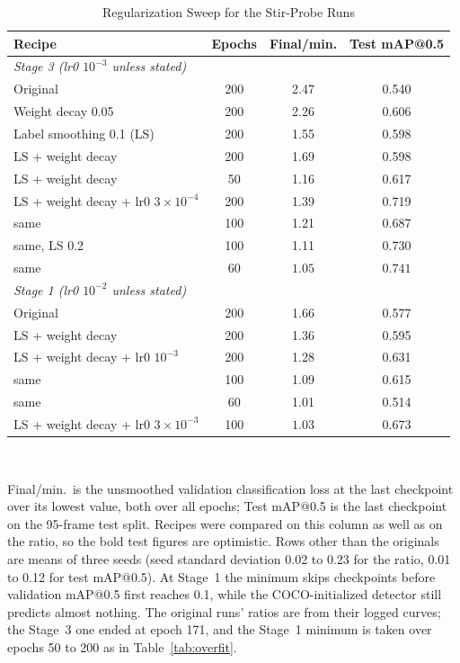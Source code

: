﻿\documentclass[journal]{IEEEtran}
\begin{document}
\begin{table}[!t]
\renewcommand{\arraystretch}{1.3}
\caption{Regularization Sweep for the Stir-Probe Runs}
\label{tab:stirreg}
\centering
\footnotesize
\setlength{\tabcolsep}{3.5pt}
\begin{tabular}{l c c c}
\toprule
\textbf{Recipe} & \textbf{Epochs} & \textbf{Final/min.} & \textbf{Test mAP@0.5} \\
\midrule
\multicolumn{4}{l}{\emph{Stage 3 (lr0 $10^{-3}$ unless stated)}} \\
Original & 200 & 2.47 & 0.540 \\
Weight decay 0.05 & 200 & 2.26 & 0.606 \\
Label smoothing 0.1 (LS) & 200 & 1.55 & 0.598 \\
LS + weight decay & 200 & 1.69 & 0.598 \\
LS + weight decay & 50 & 1.16 & 0.617 \\
LS + weight decay + lr0 $3 \times 10^{-4}$ & 200 & 1.39 & 0.719 \\
\quad same & 100 & 1.21 & 0.687 \\
\quad same, LS 0.2 & 100 & 1.11 & 0.730 \\
\quad same & 60 & $\mathbf{1.05}$ & $\mathbf{0.741}$ \\
\midrule
\multicolumn{4}{l}{\emph{Stage 1 (lr0 $10^{-2}$ unless stated)}} \\
Original & 200 & 1.66 & 0.577 \\
LS + weight decay & 200 & 1.36 & 0.595 \\
LS + weight decay + lr0 $10^{-3}$ & 200 & 1.28 & 0.631 \\
\quad same & 100 & 1.09 & 0.615 \\
\quad same & 60 & 1.01 & 0.514 \\
LS + weight decay + lr0 $3 \times 10^{-3}$ & 100 & $\mathbf{1.03}$ & $\mathbf{0.673}$ \\
\bottomrule
\end{tabular}
\\[2pt]
\parbox{\columnwidth}{\footnotesize Final/min.\ is the unsmoothed validation classification loss at the last checkpoint over its lowest value, both over all epochs; Test mAP@0.5 is the last checkpoint on the 95-frame test split. Recipes were compared on this column as well as on the ratio, so the bold test figures are optimistic. Rows other than the originals are means of three seeds (seed standard deviation 0.02 to 0.23 for the ratio, 0.01 to 0.12 for test mAP@0.5). At Stage~1 the minimum skips checkpoints before validation mAP@0.5 first reaches 0.1, while the COCO-initialized detector still predicts almost nothing. The original runs' ratios are from their logged curves; the Stage~3 one ended at epoch 171, and the Stage~1 minimum is taken over epochs 50 to 200 as in Table~\ref{tab:overfit}.}
\end{table}
\end{document}
